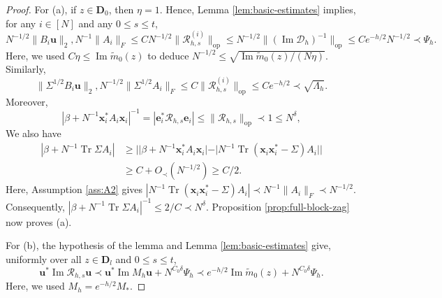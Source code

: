 \documentclass[11pt,reqno]{amsart}
\def\e{\mathbf{e}}
\def\u{\mathbf{u}}
\def\x{\mathbf{x}}
\def\cR{\mathcal{R}}
\def\cD{\mathcal{D}}
\def\bD{\mathbf{D}}
\def\Im{\operatorname{Im}}
\def\op{\mathrm{op}}
\def\Oprec{O_{\prec}}
\def\Tr{\operatorname{Tr}}
\theoremstyle{definition}
\numberwithin{equation}{section}
\numberwithin{figure}{section}
\begin{document}
\begin{proof}
For (a), if $z\in\bD_0$, then $\eta=1$. Hence, Lemma \ref{lem:basic-estimates} implies, for any $i\in[N]$ and any $0\leq s\leq t$,
\[
    N^{-1/2}\|B_i\u\|_2,N^{-1}\|A_i\|_F\leq CN^{-1/2}\|\cR_{h,s}^{(i)}\|_\op\leq N^{-1/2}\|(\Im\cD_h)^{-1}\|_\op\leq Ce^{-h/2}N^{-1/2}\prec\Psi_h . 
\]
Here, we used $C\eta\leq\Im\widetilde m_0(z)$ to deduce $N^{-1/2}\leq \sqrt{\Im\widetilde m_0(z)/(N\eta)}$.
Similarly,
\[
    \|\Sigma^{1/2} B_i\u\|_2,N^{-1/2}\|\Sigma^{1/2} A_i\|_F\leq C\|\cR_{h,s}^{(i)}\|_\op\leq Ce^{-h/2}\prec \sqrt{\Lambda_h}.
\]
Moreover,
\[
    |\beta+N^{-1}\x_i^* A_i\x_i|^{-1}=|\e_i^*\cR_{h,s}\e_i|\leq \|\cR_{h,s}\|_\op\prec 1\leq N^\delta,
\]
We also have
\begin{align*}
    |\beta+N^{-1}\Tr\Sigma A_i|&\geq ||\beta+N^{-1}\x_i^* A_i\x_i|-|N^{-1}\Tr(\x_i\x_i^*-\Sigma)A_i||\\
    &\geq C+\Oprec(N^{-1/2})\geq C/2 . 
\end{align*}
Here, Assumption \ref{ass:A2} gives $|N^{-1}\Tr(\x_i\x_i^*-\Sigma)A_i|\prec N^{-1}\|A_i\|_F\prec N^{-1/2}$. Consequently, $|\beta+N^{-1}\Tr\Sigma A_i|^{-1}\leq 2/C\prec N^\delta$. Proposition \ref{prop:full-block-zag} now proves (a).

For (b), the hypothesis of the lemma and Lemma \ref{lem:basic-estimates} give, uniformly over all $z\in\bD_l$ and $0\leq s\leq t$,
\[
    \u^*\Im\cR_{h,s}\u\prec\u^*\Im M_h\u+N^{C_0\delta}\Psi_h\prec e^{-h/2}\Im\widetilde m_0(z)+N^{C_0\delta}\Psi_h . 
\]
Here, we used $M_h=e^{-h/2}M_*$.


\end{proof}
\end{document}
